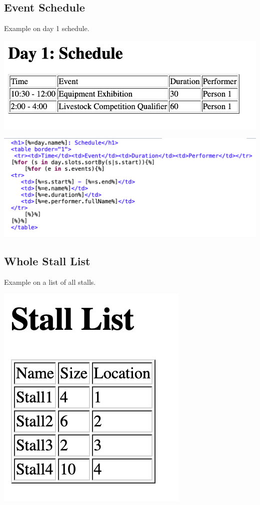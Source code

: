 \documentclass[12pt]{article}
\begin{document}
\subsection{Event Schedule}
Example on day 1 schedule.

\includegraphics[scale = 0.6]{img/schedule}

\includegraphics[scale = 0.6]{img/nestedloop}

\subsection{Whole Stall List}
Example on a list of all stalls.

\includegraphics[scale = 0.6]{img/stall-list}
\end{document}
